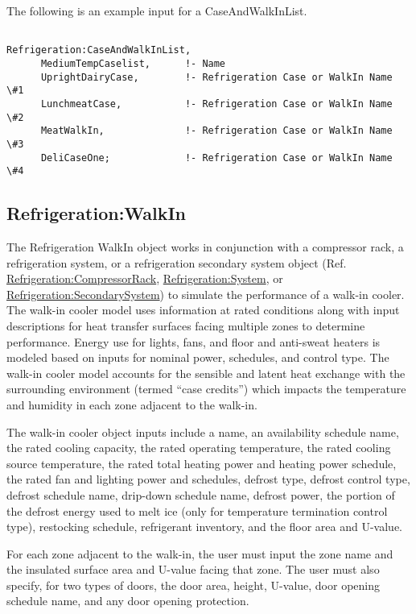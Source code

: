 The following is an example input for a CaseAndWalkInList.

\begin{lstlisting}

Refrigeration:CaseAndWalkInList,
      MediumTempCaselist,      !- Name
      UprightDairyCase,        !- Refrigeration Case or WalkIn Name \#1
      LunchmeatCase,           !- Refrigeration Case or WalkIn Name \#2
      MeatWalkIn,              !- Refrigeration Case or WalkIn Name \#3
      DeliCaseOne;             !- Refrigeration Case or WalkIn Name \#4
\end{lstlisting}

\subsection{Refrigeration:WalkIn}\label{refrigerationwalkin}

The Refrigeration WalkIn object works in conjunction with a compressor rack, a refrigeration system, or a refrigeration secondary system object (Ref. \hyperref[refrigerationcompressorrack]{Refrigeration:CompressorRack}, \hyperref[refrigerationsystem]{Refrigeration:System}, or \hyperref[refrigerationsecondarysystem]{Refrigeration:SecondarySystem}) to simulate the performance of a walk-in cooler. The walk-in cooler model uses information at rated conditions along with input descriptions for heat transfer surfaces facing multiple zones to determine performance. Energy use for lights, fans, and floor and anti-sweat heaters is modeled based on inputs for nominal power, schedules, and control type. The walk-in cooler model accounts for the sensible and latent heat exchange with the surrounding environment (termed ``case credits'') which impacts the temperature and humidity in each zone adjacent to the walk-in.

The walk-in cooler object inputs include a name, an availability schedule name, the rated cooling capacity, the rated operating temperature, the rated cooling source temperature, the rated total heating power and heating power schedule, the rated fan and lighting power and schedules, defrost type, defrost control type, defrost schedule name, drip-down schedule name, defrost power, the portion of the defrost energy used to melt ice (only for temperature termination control type), restocking schedule, refrigerant inventory, and the floor area and U-value.

For each zone adjacent to the walk-in, the user must input the zone name and the insulated surface area and U-value facing that zone. The user must also specify, for two types of doors, the door area, height, U-value, door opening schedule name, and any door opening protection.

